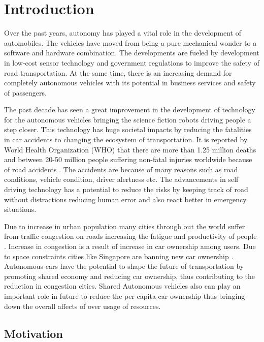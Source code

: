 \chapter{Introduction}
\label{introduction}

Over the past years, autonomy has played a vital role in the development of automobiles. The vehicles have moved from being a pure mechanical wonder to a software and hardware combination. The developments are fueled by development in low-cost sensor technology and government regulations to improve the safety of road transportation. At the same time, there is an increasing demand for completely autonomous vehicles with its potential in business services and safety of passengers.

The past decade has seen a great improvement in the development of technology for the autonomous vehicles bringing the science fiction robots driving people a step closer. This technology has huge societal impacts by reducing the fatalities in car accidents to changing the ecosystem of transportation. It is reported by World Health Organization (WHO) that there are more than 1.25 million deaths and between 20-50 million people suffering non-fatal injuries worldwide because of road accidents \cite{whoaccidents}. The accidents are because of many reasons such as road conditions, vehicle condition, driver alertness etc. The advancements in self driving technology has a potential to reduce the risks by keeping track of road without distractions reducing human error and also react better in emergency situations. 

Due to increase in urban population many cities through out the world suffer from traffic congestion on roads increasing the fatigue and productivity of people \cite{citycongestion}. Increase in congestion is a result of increase in car ownership among users. Due to space constraints cities like Singapore are banning new car ownership \cite{singaporebanscars}. Autonomous cars have the potential to shape the future of transportation by promoting shared economy and reducing car ownership, thus contributing to the reduction in congestion cities. Shared Autonomous vehicles also can play an important role in future to reduce the per capita car ownership thus bringing down the overall affects of over usage of resources. 


\section{Motivation}

